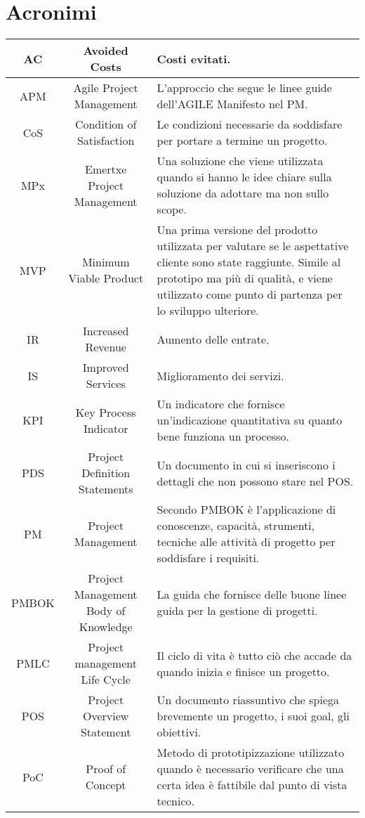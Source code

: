 \section{Acronimi}

\begin{tabularx}{\textwidth}{|c|c|X|}
	\hline
	AC & Avoided Costs & Costi evitati.\\
	\hline
	APM & Agile Project Management & L'approccio che segue le linee guide dell'AGILE Manifesto nel PM.\\
	\hline
	CoS & Condition of Satisfaction & Le condizioni necessarie da soddisfare per portare a termine un progetto. \\
	\hline
	MPx & Emertxe Project Management &
	Una soluzione che viene utilizzata quando si hanno le idee chiare sulla soluzione da adottare ma non sullo scope.\\
	\hline
	MVP & Minimum Viable Product & Una prima versione del prodotto utilizzata per valutare se le aspettative cliente sono state raggiunte. Simile al prototipo ma più di qualità, e viene utilizzato come punto di partenza per lo sviluppo ulteriore. \\
	\hline
	IR & Increased Revenue & Aumento delle entrate.\\
	\hline
	IS & Improved Services & Miglioramento dei servizi.\\
	\hline
	KPI & Key Process Indicator & Un indicatore che fornisce un'indicazione quantitativa su quanto bene funziona un processo. \\
	\hline
	PDS & Project Definition Statements & Un documento in cui si inseriscono i dettagli che non possono stare nel POS.\\
	\hline
	PM & Project Management & Secondo PMBOK è l'applicazione di conoscenze, capacità, strumenti, tecniche alle attività di progetto per soddisfare i requisiti.\\
	\hline
	PMBOK & Project Management Body of Knowledge & La guida che fornisce delle buone linee guida per la gestione di progetti.\\
	\hline
	PMLC & Project management Life Cycle & Il ciclo di vita è tutto ciò che accade da quando inizia e finisce un progetto.\\
	\hline
	POS & Project Overview Statement & Un documento riassuntivo che spiega brevemente un progetto, i suoi goal, gli obiettivi. \\
	\hline
	PoC & Proof of Concept & Metodo di prototipizzazione utilizzato quando è necessario verificare che una certa idea è fattibile dal punto di vista tecnico.\\

\end{tabularx}
